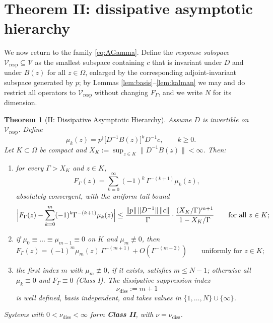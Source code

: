 \documentclass[11pt]{article}
\newtheorem{theorem}{Theorem}
\newcommand{\Vresp}{\mathcal V_{\mathrm{resp}}}
\newcommand{\nudiss}{\nu_{\mathrm{diss}}}
\begin{document}
\section{Theorem II: dissipative asymptotic hierarchy}

We now return to the family \eqref{eq:AGamma}. Define the \emph{response
subspace} $\Vresp\subseteq\mathcal V$ as the smallest subspace containing $c$
that is invariant under $D$ and under $B(z)$ for all $z\in\Omega$, enlarged by
the corresponding adjoint-invariant subspace generated by $p$; by Lemmas
\ref{lem:basis}--\ref{lem:kalman} we may and do restrict all operators to
$\Vresp$ without changing $F_\Gamma$, and we write $N$ for its dimension.

\begin{theorem}[II: Dissipative Asymptotic Hierarchy]
\label{thm:II}
Assume $D$ is invertible on $\Vresp$. Define
\[
\mu_k(z)=p^\dagger\bigl[D^{-1}B(z)\bigr]^kD^{-1}c ,\qquad k\ge0 .
\]
Let $K\subset\Omega$ be compact and $X_K:=\sup_{z\in K}\|D^{-1}B(z)\|<\infty$.
Then:
\begin{enumerate}[label=(\roman*),nosep]
\item for every $\Gamma>X_K$ and $z\in K$,
\[
F_\Gamma(z)=\sum_{k=0}^{\infty}(-1)^k\,\Gamma^{-(k+1)}\mu_k(z),
\]
absolutely convergent, with the uniform tail bound
\[
\Bigl|F_\Gamma(z)-\sum_{k=0}^{m}(-1)^k\Gamma^{-(k+1)}\mu_k(z)\Bigr|
\le\frac{\|p\|\,\|D^{-1}\|\,\|c\|}{\Gamma}\cdot
\frac{(X_K/\Gamma)^{m+1}}{1-X_K/\Gamma}
\qquad\text{for all }z\in K;
\]
\item if $\mu_0\equiv\dots\equiv\mu_{m-1}\equiv0$ on $K$ and
      $\mu_m\not\equiv0$, then
\[
F_\Gamma(z)=(-1)^m\mu_m(z)\,\Gamma^{-(m+1)}+O(\Gamma^{-(m+2)})
\qquad\text{uniformly for }z\in K;
\]
\item the first index $m$ with $\mu_m\not\equiv0$, if it exists, satisfies
      $m\le N-1$; otherwise all $\mu_k\equiv0$ and $F_\Gamma\equiv0$
      (Class I). The \emph{dissipative suppression index}
\[
\boxed{\;\nudiss:=m+1\;}
\]
is well defined, basis independent, and takes values in
$\{1,\dots,N\}\cup\{\infty\}$.
\end{enumerate}
Systems with $0<\nudiss<\infty$ form \textbf{Class II}, with
$\nu=\nudiss$.
\end{theorem}
\end{document}

